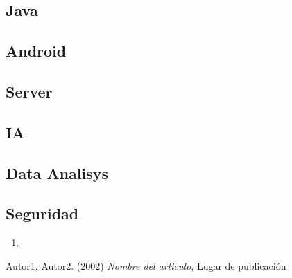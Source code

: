 \documentclass{article}
\theoremstyle{definition}
\begin{document}
\subsection{Java}

\subsection{Android}

\subsection{Server}

\subsection{IA}

\subsection{Data Analisys}

\subsection{Seguridad}


\begin{enumerate}
    \item 
\end{enumerate}

\begin{thebibliography}{9}
Autor1, Autor2. (2002) \textit{Nombre del articulo}, Lugar de publicación

\end{thebibliography}
\end{document}
